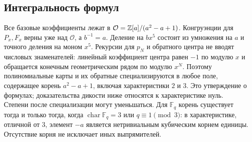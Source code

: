 \subsection{Интегральность формул}
Все базовые коэффициенты лежат в
$\mathcal O={\mathbb Z}[a]/(a^2-a+1)$. Конгруэнции для $P_x,F_x$ верны
уже над $\mathcal O$, а $b^{-1}=a$. Деление на $bx^5$ состоит из
умножения на $a$ и точного деления на моном $x^5$.
Рекурсии для $p_N$ и обратного центра не вводят числовых знаменателей:
линейный коэффициент центра равен $-1$ по модулю $x$ и обращается
конечным геометрическим рядом по модулю $x^N$.
Поэтому полиномиальные карты и их обратные специализируются в любое поле,
содержащее корень $a^2-a+1$, включая характеристики $2$ и $3$.
Это утверждение о формулах; доказательства дикости ниже относятся к
характеристике нуль. Степени после специализации могут уменьшаться.
Для $\mathbb F_q$ корень существует тогда и только тогда, когда
$\operatorname{char}\mathbb F_q=3$ или $q\equiv1\pmod3$:
в характеристике, отличной от $3$, элемент $-a$ является нетривиальным
кубическим корнем единицы. Отсутствие корня не исключает иных выпрямителей.
